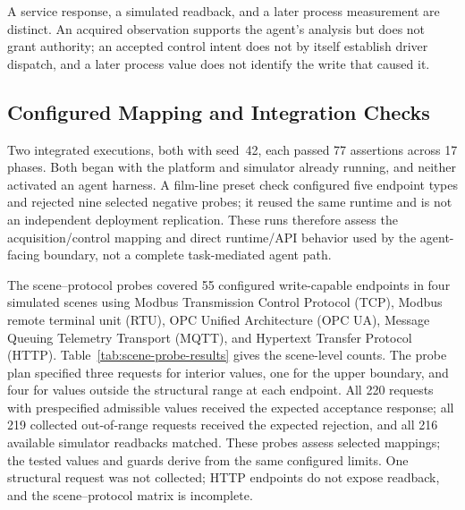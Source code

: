 \documentclass[journal]{IEEEtran}
\begin{document}
A service response, a simulated readback, and a later process measurement are distinct. An acquired observation supports the agent's analysis but does not grant authority; an accepted control intent does not by itself establish driver dispatch, and a later process value does not identify the write that caused it.

\subsection{Configured Mapping and Integration Checks}
\label{sec:eval-mapping}
Two integrated executions, both with seed~42, each passed 77 assertions across 17 phases. Both began with the platform and simulator already running, and neither activated an agent harness. A film-line preset check configured five endpoint types and rejected nine selected negative probes; it reused the same runtime and is not an independent deployment replication. These runs therefore assess the acquisition/control mapping and direct runtime/API behavior used by the agent-facing boundary, not a complete task-mediated agent path.

The scene--protocol probes covered 55 configured write-capable endpoints in four simulated scenes using Modbus Transmission Control Protocol (TCP), Modbus remote terminal unit (RTU), OPC Unified Architecture (OPC UA), Message Queuing Telemetry Transport (MQTT), and Hypertext Transfer Protocol (HTTP). Table~\ref{tab:scene-probe-results} gives the scene-level counts. The probe plan specified three requests for interior values, one for the upper boundary, and four for values outside the structural range at each endpoint. All 220 requests with prespecified admissible values received the expected acceptance response; all 219 collected out-of-range requests received the expected rejection, and all 216 available simulator readbacks matched. These probes assess selected mappings; the tested values and guards derive from the same configured limits. One structural request was not collected; HTTP endpoints do not expose readback, and the scene--protocol matrix is incomplete.
\end{document}
